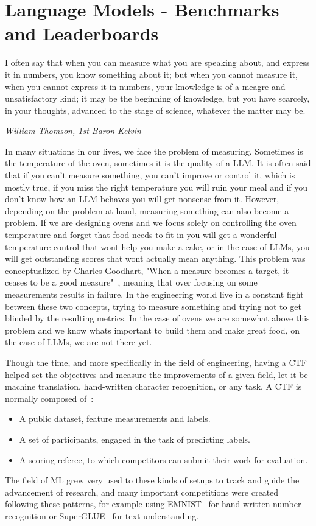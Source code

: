 \section{Language Models - Benchmarks and Leaderboards}\label{sec:b}


\epigraph{I often say that when you can measure what you are speaking about, and express it in numbers, you know something about it; but when you cannot measure it, when you cannot express it in numbers, your knowledge is of a meagre and unsatisfactory kind; it may be the beginning of knowledge, but you have scarcely, in your thoughts, advanced to the stage of science, whatever the matter may be.}{\textit{William Thomson, 1st Baron Kelvin}}

In many situations in our lives, we face the problem of measuring. Sometimes is the temperature of the oven, sometimes it is the quality of a \gls{LLM}. It is often said that if you can't measure something, you can't improve or control it, which is mostly true, if you miss the right temperature you will ruin your meal and if you don't know how an \gls{LLM} behaves you will get nonsense from it. 
However, depending on the problem at hand, measuring something can also become a problem. If we are designing ovens and we focus solely on controlling the oven temperature and forget that food needs to fit in you will get a wonderful temperature control that wont help you make a cake, or in the case of \gls{LLM}s, you will get outstanding scores that wont actually mean anything. This problem was conceptualized by Charles Goodhart, "When a measure becomes a target, it ceases to be a good measure"~\cite{strathern1997improving}, meaning that over focusing on some measurements results in failure.
In the engineering world live in a constant fight between these two concepts, trying to measure something and trying not to get blinded by the resulting metrics. In the case of ovens we are somewhat above this problem and we know whats important to build them and make great food, on the case of \gls{LLM}s, we are not there yet.


Though the time, and more specifically in the field of engineering, having a \gls{CTF} helped set the objectives and measure the improvements of a given field, let it be machine translation, hand-written character recognition, or any task. A \gls{CTF} is normally composed of~\cite{donoho201750}:
\begin{itemize}
    \item A public dataset, feature measurements and labels.
    \item A set of participants, engaged in the task of predicting labels.
    \item A scoring referee, to which competitors can submit their work for evaluation.
\end{itemize}
The field of \gls{ML} grew very used to these kinds of setups to track and guide the advancement of research, and many important competitions were created following these patterns, for example using EMNIST~\cite{cohen2017emnist} for hand-written number recognition or SuperGLUE~\cite{wang2019superglue} for text understanding. 

